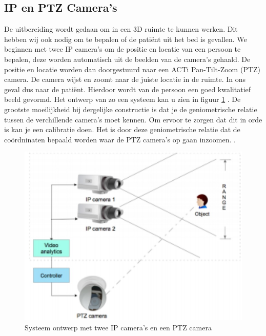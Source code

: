 \subsection{IP en PTZ Camera's}
\label{refIPC2}
De uitbereiding wordt gedaan om in een 3D ruimte te kunnen werken. Dit hebben wij ook nodig om te bepalen of de pati\"ent uit het bed is gevallen. We beginnen met twee IP camera's om de positie en locatie van een persoon te bepalen, deze worden automatisch uit de beelden van de camera's gehaald. De positie en locatie worden dan doorgestuurd naar een ACTi Pan-Tilt-Zoom (PTZ) camera. De camera wijst en zoomt naar de juiste locatie in de ruimte. In ons geval dus naar de pati\"ent. Hierdoor wordt van de persoon een goed kwalitatief beeld gevormd. Het ontwerp van zo een systeem kan u zien in figuur \ref{imgIPC2} \cite{bibIPC}. De grootste moeilijkheid bij dergelijke constructie is dat je de geniometrische relatie tussen de verchillende camera's moet kennen. Om ervoor te zorgen dat dit in orde is kan je een calibratie doen. Het is door deze geniometrische relatie dat de co\"ordninaten bepaald worden waar de PTZ camera's op gaan inzoomen.  \cite{bibVTC3}.

\begin{figure}[h]
	\includegraphics[scale=0.5]{IPPTZCamera}
	\caption{Systeem ontwerp met twee IP camera's en een PTZ camera}
	\label{imgIPC2}
\end{figure}

